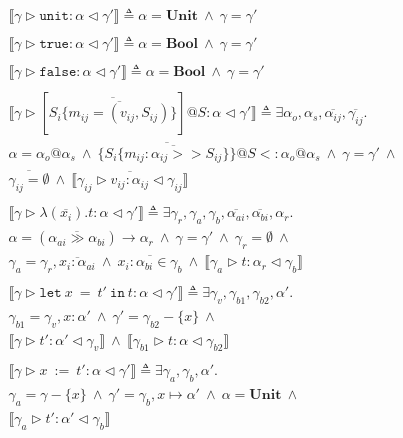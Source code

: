 \documentclass{article}
\newcommand{\inferrule}[4]{\llbracket #1 \triangleright #2 : #3 \triangleleft #4 \rrbracket}
\newcommand{\inferlhs}[1]{\llbracket \gamma \triangleright #1 : \alpha \triangleleft \gamma' \rrbracket}
\newcommand{\unitv}{\mathtt{unit}}
\newcommand{\unitt}{\mathbf{Unit}}
\newcommand{\truev}{\mathtt{true}}
\newcommand{\falsev}{\mathtt{false}}
\newcommand{\boolt}{\mathbf{Bool}}
\newcommand{\lett}[3]{\mathtt{let}\:#1\:\mathtt{=}\:#2\:\mathtt{in}\:#3}
\newcommand{\cand}{\:\wedge\:}
\begin{document}
\[
\begin{array}{l}

\inferlhs{\unitv} \triangleq \alpha = \unitt \cand \gamma = \gamma' 
\\\\

\inferlhs{\truev} \triangleq \alpha = \boolt \cand \gamma = \gamma' 
\\\\

\inferlhs{\falsev} \triangleq \alpha = \boolt \cand \gamma = \gamma' 
\\\\

\inferlhs{[ \overline{S_i \{ \overline{ m_{ij} = (v_{ij}, S_{ij}) } \} }]@S}
\triangleq
\exists \alpha_o, \alpha_s, \overline{\alpha_{ij}}, \overline{\gamma_{ij}} . \\
\alpha = \alpha_o@\alpha_s
\cand
\{ \overline{ S_i \{ \overline{ m_{ij} : \alpha_{ij} >> S_{ij} } \} }\}@S <: \alpha_o@\alpha_s
\cand
\gamma = \gamma'
\cand
\\
\overline{\gamma_{ij} = \emptyset}
\cand
\overline{\inferrule{\gamma_{ij}}{v_{ij}}{\alpha_{ij}}{\gamma_{ij}}}
\\\\

\inferlhs{\lambda ( \overline{x_i} ) . t} \triangleq
\exists \gamma_r, \gamma_a, \gamma_b, \overline{\alpha_{ai}}, \overline{\alpha_{bi}}, \alpha_r . \\
\alpha = (\overline{\alpha_{ai} \gg \alpha_{bi}}) \rightarrow \alpha_r
\cand
\gamma = \gamma'
\cand
\gamma_r = \emptyset
\cand \\
\gamma_a = \gamma_r, \overline{x_i : \alpha_{ai}}
\cand
\overline{x_i : \alpha_{bi} \in \gamma_b}
\cand
\inferrule{\gamma_a}{t}{\alpha_r}{\gamma_b} 
\\\\

\inferlhs{\lett{x}{t'}{t}} \triangleq \exists \gamma_v, \gamma_{b1}, \gamma_{b2}, \alpha' . \\
\gamma_{b1} = \gamma_v, x : \alpha'
\cand
\gamma' = \gamma_{b2} - \{ x \}
\cand \\
\inferrule{\gamma}{t'}{\alpha'}{\gamma_v}
\cand
\inferrule{\gamma_{b1}}{t}{\alpha}{\gamma_{b2}}
\\\\

\inferlhs{x\:\mathtt{:=}\:t'} \triangleq
\exists \gamma_a, \gamma_b, \alpha' . \\
\gamma_a = \gamma - \{ x \}
\cand
\gamma' = \gamma_b, x \mapsto \alpha'
\cand 
\alpha = \unitt
\cand \\
\inferrule{\gamma_a}{t'}{\alpha'}{\gamma_b}
\\\\


\end{array}\]
\end{document}
